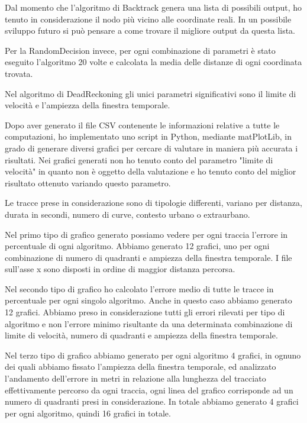\documentclass[12pt,a4paper,openright,twoside]{report}
\begin{document}
Dal momento che l'algoritmo di Backtrack genera una lista di possibili output, ho tenuto in considerazione il nodo più vicino alle coordinate reali. In un possibile sviluppo futuro si può pensare a come trovare il migliore output da questa lista.

Per la RandomDecision invece, per ogni combinazione di parametri è stato eseguito l'algoritmo 20 volte e calcolata la media delle distanze di ogni coordinata trovata.

Nel algoritmo di DeadReckoning gli unici parametri significativi sono il limite di velocità e l'ampiezza della finestra temporale.

Dopo aver generato il file CSV contenente le informazioni relative a tutte le computazioni, ho implementato uno script in Python, mediante matPlotLib, in grado di generare diversi grafici per cercare di valutare in maniera più accurata i risultati. Nei grafici generati non ho tenuto conto del parametro "limite di velocità" in quanto non è oggetto della valutazione e ho tenuto conto del miglior risultato ottenuto variando questo parametro.

Le tracce prese in considerazione sono di tipologie differenti, variano per distanza, durata in secondi, numero di curve, contesto urbano o extraurbano.

Nel primo tipo di grafico generato possiamo vedere per ogni traccia l'errore in percentuale di ogni algoritmo. Abbiamo generato 12 grafici, uno per ogni combinazione di numero di quadranti e ampiezza della finestra temporale. I file sull'asse x sono disposti in ordine di maggior distanza percorsa.

Nel secondo tipo di grafico ho calcolato l'errore medio di tutte le tracce in percentuale per ogni singolo algoritmo. Anche in questo caso abbiamo generato 12 grafici. Abbiamo preso in considerazione tutti gli errori rilevati per tipo di algoritmo e non l'errore minimo risultante da una determinata combinazione di limite di velocità, numero di quadranti e ampiezza della finestra temporale.

Nel terzo tipo di grafico abbiamo generato per ogni algoritmo 4 grafici, in ognuno dei quali abbiamo fissato l'ampiezza della finestra temporale, ed analizzato l'andamento dell'errore in metri in relazione alla lunghezza del tracciato effettivamente percorso da ogni traccia, ogni linea del grafico corrisponde ad un numero di quadranti presi in considerazione. In totale abbiamo generato 4 grafici per ogni algoritmo, quindi 16 grafici in totale.
\end{document}
